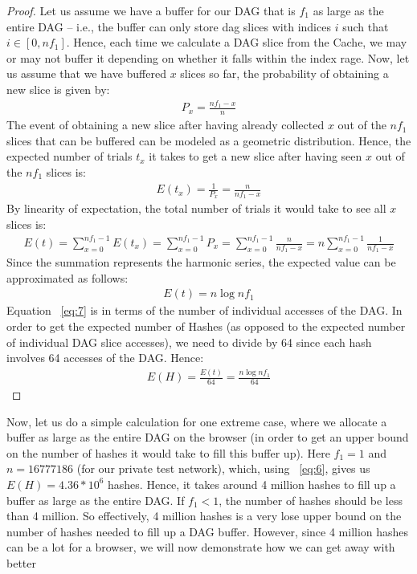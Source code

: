 \documentclass[runningheads]{llncs}
\begin{document}
\begin{proof}
Let us assume we have a buffer for our DAG that is $f_1$ as large as the entire DAG -- i.e., the buffer can only store dag slices with indices $i$ such that $i \in [0,nf_1]$. Hence, each time we calculate a DAG slice from the Cache, we may or may not buffer it depending on whether it falls within the index rage. Now, let us assume that  we have buffered $x$ slices so far, the probability of obtaining a new slice is given by:
\begin{gather}
	P_x = \frac{nf_1-x}{n}
\end{gather}
The event of obtaining a new slice after having already collected $x$ out of the $nf_1$ slices that can be buffered can be modeled as a geometric distribution. Hence, the expected number of trials $t_x$ it takes to get a new  slice after having seen $x$ out of the $nf_1$ slices is:
\begin{gather}
	E(t_x) = \frac{1}{P_x} = \frac{n}{nf_1-x}
\end{gather}
By linearity of expectation, the total number of trials it would take to see all $x$ slices is:
\begin{gather}
	E(t) = \sum_{x=0}^{nf_1-1}E(t_x) = \sum_{x=0}^{nf_1-1}P_x = \sum_{x=0}^{nf_1-1}\frac{n}{nf_1-x} = n\sum_{x=0}^{nf_1-1}\frac{1}{nf_1-x}
\end{gather}
Since the summation represents the harmonic series, the expected value can be approximated as follows:
\begin{gather}
	E(t) = n\log{nf_1}
\end{gather}
Equation ~\ref{eq:7} is in terms of the number of individual accesses of the DAG. In order to get the expected number of Hashes (as opposed to the expected number of individual DAG slice accesses), we need to divide by 64 since each hash involves 64 accesses of the DAG. Hence: 
\begin{gather}
	E(H) = \frac{E(t)}{64} = \frac{n\log{nf_1}}{64}
\end{gather}
\end{proof}
Now, let us do a simple calculation for one extreme case, where we allocate a buffer as large as the entire DAG on the browser (in order to get an upper bound on the number of hashes it would take to fill this buffer up). Here $f_1 = 1$ and $n = 16777186$ (for our private test network), which, using ~\ref{eq:6}, gives us $E(H) = 4.36*10^6$ hashes. Hence, it takes around 4 million hashes to fill up a buffer as large as the entire DAG. If $f_1 < 1$, the number of hashes should be less than 4 million. So effectively, 4 million hashes is a very lose upper bound on the number of hashes needed to fill up a DAG buffer. However, since 4 million hashes can be a lot for a browser, we will now demonstrate how we can get away with  better
\end{document}
